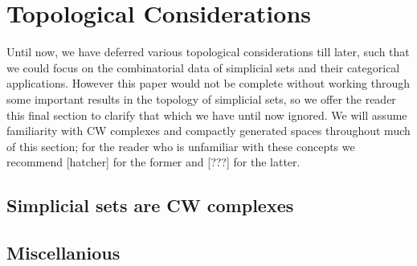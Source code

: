\section{Topological Considerations}

Until now, we have deferred various topological considerations till later, such that we could focus on the combinatorial data of simplicial sets and their categorical applications. However this paper would not be complete without working through some important results in the topology of simplicial sets, so we offer the reader this final section to clarify that which we have until now ignored. We will assume familiarity with CW complexes and compactly generated spaces throughout much of this section; for the reader who is unfamiliar with these concepts we recommend [hatcher] for the former and [???] for the latter.

\subsection{Simplicial sets are CW complexes}
\subsection{Miscellanious}
